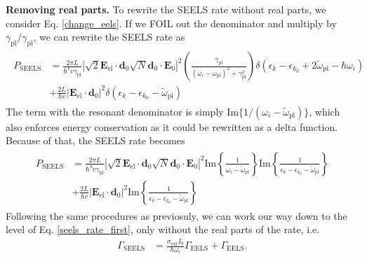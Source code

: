 \documentclass [11pt, proquest] {uwthesis}[2016/11/22]
\begin{document}
{\bf Removing real parts.} To rewrite the SEELS rate without real parts, we consider Eq. \ref{change_eels}. If we FOIL out the denominator and multiply by $\gamma_{\textrm{pl}}/\gamma_{\textrm{pl}}$, we can rewrite the SEELS rate as
\begin{align}
\begin{split}
  P_{\textrm{SEELS}} &= \frac{2\pi L}{\hbar^4v\gamma_{\textrm{pl}}}\left|\sqrt{2}\textbf{E}_{\textrm{el}}\cdot\textbf{d}_0 \sqrt{N}\textbf{d}_0\cdot\textbf{E}_{0}\right|^2\left(\frac{\gamma_{\textrm{pl}}}{(\omega_i - \omega_{\textrm{pl}})^2 + \gamma_{\textrm{pl}}^2}\right)\delta(\epsilon_k - \epsilon_{k_0} + 2\tilde{\omega}_{\textrm{pl}} - \hbar\omega_i)\\
  &+ \frac{2L}{\hbar v}|\textbf{E}_{\textrm{el}}\cdot\textbf{d}_0|^2\delta(\epsilon_k - \epsilon_{k_0} - \tilde{\omega}_{\textrm{pl}})
  \label{mult_gamma}
  \end{split}
\end{align}
The term with the resonant denominator is simply $\textrm{Im}\{1/(\omega_i - \tilde{\omega}_{\textrm{pl}})\}$, which also enforces energy conservation as it could be rewritten as a delta function. Because of that, the SEELS rate becomes
\begin{align}
\begin{split}
  P_{\textrm{SEELS}} &= \frac{2\pi L}{\hbar^4v\gamma_{\textrm{pl}}}\left|\sqrt{2}\textbf{E}_{\textrm{el}}\cdot\textbf{d}_0 \sqrt{N}\textbf{d}_0\cdot\textbf{E}_{0}\right|^2\textrm{Im}\left\{\frac{1}{\omega_i - \tilde{\omega}_{\textrm{pl}}}\right\}\textrm{Im}\left\{\frac{1}{\epsilon_k - \epsilon_{k_0} - \tilde{\omega}_{\textrm{pl}}}\right\}\\
  &+ \frac{2L}{\hbar v}|\textbf{E}_{\textrm{el}}\cdot\textbf{d}_0|^2\textrm{Im}\left\{\frac{1}{\epsilon_k - \epsilon_{k_0} - \tilde{\omega}_{\textrm{pl}}}\right\}
  \label{imag}
  \end{split}
\end{align}
Following the same procedures as previosuly, we can work our way down to the level of Eq. \ref{seels_rate_first}, only without the real parts of the rate, i.e.
\begin{equation}
\begin{split}
  \Gamma_{\textrm{SEELS}} &= \frac{\sigma_{\textrm{ext}}I_0}{\hbar\omega_i}\Gamma_{\textrm{EELS}} + \Gamma_{\textrm{EELS}}.
  \label{seels_rate_first_imag}
  \end{split}
\end{equation}
\end{document}
